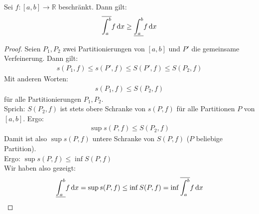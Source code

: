 \begin{Satz}{\label{kap09_satz17}
	Sei $f: [a,b] \rightarrow \mathbb{R}$ beschränkt. Dann gilt:
	\begin{align*}
		\overline{\int_{a}^{b}} f \dd{x} \geq \underline{\int_{a}^{b}} f \dd{x}
	\end{align*}
}\end{Satz}

\begin{proof}
	Seien $P_1, P_2$ zwei Partitionierungen von $[a,b]$ und 
	$P'$ die gemeinsame Verfeinerung. Dann gilt:
	\begin{align*}
		s(P_1,f) \leq s(P',f) \leq S(P',f) \leq S(P_2, f) 
	\end{align*}
	Mit anderen Worten:
	\begin{align*}
		s(P_1, f) \leq S(P_2, f)
	\end{align*}
	für alle Partitionierungen $P_1, P_2$. \\
	Sprich: $S(P_2,f)$ ist stets obere Schranke von $s(P,f)$ für alle Partitionen 
	$P$ von $[a,b]$. Ergo:
	\begin{align*}
		\sup s(P,f) \leq S (P_2, f)
	\end{align*}
	Damit ist also $\sup s(P,f)$ untere Schranke von $S(P,f)$ ($P$ beliebige 
	Partition). \\
	Ergo: $\sup s(P,f) \leq \inf S (P,f)$  \\
	Wir haben also gezeigt:
	\begin{align*}
		\underline{\int_a^b} f \dd{x} = \sup s(P,f) \leq 
		\inf S(P,f) = \inf \overline{\int_{a}^{b}} f \dd{x} 
	\end{align*}
\end{proof}
